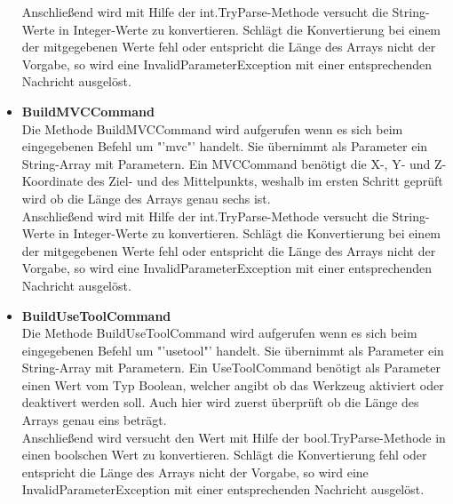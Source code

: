 \begin{itemize}
Anschließend wird mit Hilfe der int.TryParse-Methode versucht die String-Werte in Integer-Werte zu konvertieren. Schlägt die Konvertierung bei einem der mitgegebenen Werte fehl oder entspricht die Länge des Arrays nicht der Vorgabe, so wird eine InvalidParameterException mit einer entsprechenden Nachricht ausgelöst.
\item \textbf{BuildMVCCommand}\\
Die Methode BuildMVCCommand wird aufgerufen wenn es sich beim eingegebenen Befehl um "'mvc"' handelt. Sie übernimmt als Parameter ein String-Array mit Parametern. Ein MVCCommand benötigt die X-, Y- und Z-Koordinate des Ziel- und des Mittelpunkts, weshalb im ersten Schritt geprüft wird ob die Länge des Arrays genau sechs ist. \\
Anschließend wird mit Hilfe der int.TryParse-Methode versucht die String-Werte in Integer-Werte zu konvertieren. Schlägt die Konvertierung bei einem der mitgegebenen Werte fehl oder entspricht die Länge des Arrays nicht der Vorgabe, so wird eine InvalidParameterException mit einer entsprechenden Nachricht ausgelöst.
\item \textbf{BuildUseToolCommand}\\
Die Methode BuildUseToolCommand wird aufgerufen wenn es sich beim eingegebenen Befehl um "'usetool"' handelt. Sie übernimmt als Parameter ein String-Array mit Parametern. Ein UseToolCommand benötigt als Parameter einen Wert vom Typ Boolean, welcher angibt ob das Werkzeug aktiviert oder deaktivert werden soll. Auch hier wird zuerst überprüft ob die Länge des Arrays genau eins beträgt.\\
Anschließend wird versucht den Wert mit Hilfe der bool.TryParse-Methode in einen boolschen Wert zu konvertieren. Schlägt die Konvertierung fehl oder entspricht die Länge des Arrays nicht der Vorgabe, so wird eine InvalidParameterException mit einer entsprechenden Nachricht ausgelöst.
\end{itemize}

